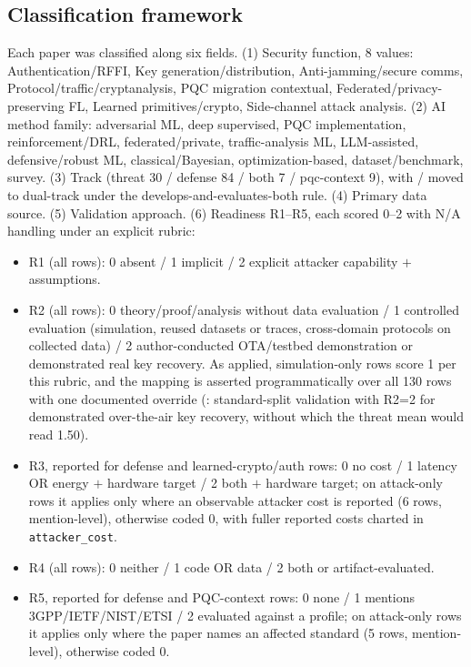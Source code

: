 \documentclass[10.5pt,compsoc,winfonts]{ICN}
\newcommand{\upcite}[1]{\cite{#1}}
\begin{document}
\subsection{Classification framework}
Each paper was classified along six fields. (1) Security function, 8 values: Authentication/RFFI, Key generation/distribution, Anti-jamming/secure comms, Protocol/traffic/cryptanalysis, PQC migration contextual, Federated/privacy-preserving FL, Learned primitives/crypto, Side-channel attack analysis. (2) AI method family: adversarial ML, deep supervised, PQC implementation, reinforcement/DRL, federated/private, traffic-analysis ML, LLM-assisted, defensive/robust ML, classical/Bayesian, optimization-based, dataset/benchmark, survey. (3) Track (threat 30 / defense 84 / both 7 / pqc-context 9), with \upcite{T05}/\upcite{T14} moved to dual-track under the develops-and-evaluates-both rule. (4) Primary data source. (5) Validation approach. (6) Readiness R1–R5, each scored 0–2 with N/A handling under an explicit rubric:
\begin{itemize}\setlength\itemsep{1pt}
\item R1 (all rows): 0 absent / 1 implicit / 2 explicit attacker capability $+$ assumptions.
\item R2 (all rows): 0 theory/proof/analysis without data evaluation / 1 controlled evaluation (simulation, reused datasets or traces, cross-domain protocols on collected data) / 2 author-conducted OTA/testbed demonstration or demonstrated real key recovery. As applied, simulation-only rows score 1 per this rubric, and the mapping is asserted programmatically over all 130 rows with one documented override (\upcite{T01}: standard-split validation with R2=2 for demonstrated over-the-air key recovery, without which the threat mean would read 1.50).
\item R3, reported for defense and learned-crypto/auth rows: 0 no cost / 1 latency OR energy $+$ hardware target / 2 both $+$ hardware target; on attack-only rows it applies only where an observable attacker cost is reported (6 rows, mention-level), otherwise coded 0, with fuller reported costs charted in \texttt{attacker\_cost}.
\item R4 (all rows): 0 neither / 1 code OR data / 2 both or artifact-evaluated.
\item R5, reported for defense and PQC-context rows: 0 none / 1 mentions 3GPP/IETF/NIST/ETSI / 2 evaluated against a profile; on attack-only rows it applies only where the paper names an affected standard (5 rows, mention-level), otherwise coded 0.
\end{itemize}
\end{document}
